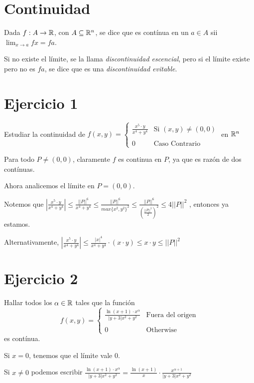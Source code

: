 \documentclass{article}
\begin{document}
\section{Continuidad}
Dada $f : A \to \mathbb{R}$, con $A \subseteq \mathbb{R}^n$, se dice que es contínua en un $a \in A$
sii $\lim_{x \to a} fx = fa$.

Si no existe el límite, se la llama \emph{discontinuidad escencial},
pero si el límite existe pero no es $fa$, se dice que es una
\emph{discontinuidad evitable}.

\section{Ejercicio 1}
Estudiar la continuidad de $
f(x,y) = \left\{
	\begin{matrix}
		\frac{ x^5 \cdot y}{x^4 + y^4} & \text{Si $(x,y) \neq (0, 0)$} \\
		\; \\
		0 & \text{Caso Contrario}
	\end{matrix}
\right.
$ en $\mathbb{R}^n$

Para todo $P \neq (0, 0)$, claramente $f$ es continua en $P$, ya que es razón
de dos contínuas.

Ahora analicemos el límite en $P = (0, 0)$.

Notemos que
$\left|\frac{x^5 \cdot y}{x^4 + y^4}\right|
\leq \frac{||P||^6}{x^4 + y^4} \leq
\frac{||P||^6}{max\{x^2, y^2\}^2} \leq
\frac{||P||^6}{\left(\frac{||P||^2}{2}\right)^2}
\leq 4||P||^2$
, entonces ya estamos.

Alternativamente, 
$\left|\frac{x^5 \cdot y}{x^4 + y^4}\right|
\leq \frac{|x|^4}{x^4 + y^4} \cdot (x \cdot y) \leq x \cdot y \leq ||P||^2$

\section{Ejercicio 2}
Hallar todos los $\alpha \in \mathbb{R}$ tales que la función
\[
	f(x, y) = \left\{
		\begin{matrix}
			\frac{\ln (x+1) \cdot x^\alpha}{ |y+3|x^2 + y^2}
			& \text{Fuera del origen} \\
			\; \\
			0 & \text{Otherwise}
		\end{matrix}
	\right.
\]
es contínua.

Si $x = 0$, tenemos que el límite vale $0$.

Si $x \neq 0$ podemos escribir
$
\frac{\ln (x+1) \cdot x^\alpha}{ |y+3|x^2 + y^2} = \frac{\ln (x+1)}{x} \cdot
\frac{x^{\alpha+1}}{|y+3|x^2 + y^2}
$
\end{document}
